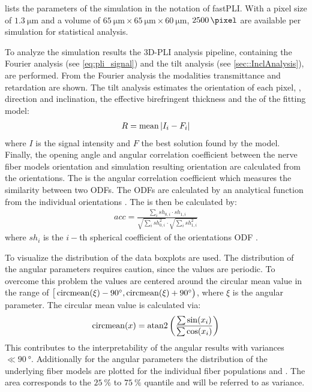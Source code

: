 %
 lists the parameters of the simulation in the notation of \ac{fastPLI}.
With a pixel size of $\SI{1.3}{\micro\meter}$ and a volume of $\SI{65}{\micro\meter} \times \SI{65}{\micro\meter} \times \SI{60}{\micro\meter}$, $\SI{2500}{\pixel}$ are available per simulation for statistical analysis.
\par
%
To analyze the simulation results the \ac{3D-PLI} analysis pipeline, containing the Fourier analysis (see \cref{eq:pli_signal}) and the tilt analysis (see \cref{sec::InclAnalysis}), are performed.
From the Fourier analysis the modalities transmittance and retardation are shown.
The tilt analysis estimates the orientation of each pixel, \ie{}, direction and inclination, the effective birefringent thickness \trel{} and the \rvalue{} of the fitting model:
\begin{align}
    R = \operatorname{mean}{|I_i-F_i|} \label{eq:rvalue}
\end{align}
where $I$ is the signal intensity and $F$ the best solution found by the model.
Finally, the opening angle \openingAngle{} and angular correlation coefficient \accvalue{} between the nerve fiber models orientation and simulation resulting orientation are calculated from the orientations.
The \accvalue{} is the angular correlation coefficient which measures the similarity between two \acp{ODF}. The \acp{ODF} are calculated by an analytical function from the individual orientations \cite{Alimi2020}.
The \accvalue{} is then be calculated by:
\begin{align}
    acc = \frac{\sum_i{\mathit{sh}_{0,i} \cdot \mathit{sh}_{1,i}}}{\sqrt{\sum_i{\mathit{sh}_{0,i}^2}} \cdot \sqrt{\sum_i{\mathit{sh}_{1,i}^2}}}
\end{align}
where $\mathit{sh}_i$ is the $i-$th spherical coefficient of the orientations \ac{ODF} \cite{Schilling2018}.
\par
%
To visualize the distribution of the data boxplots are used.
The distribution of the angular parameters requires caution, since the values are periodic.
To overcome this problem the values are centered around the circular mean value in the range of $\big[\operatorname{circmean} (\xi)-\SI{90}{\degree}, \operatorname{circmean}(\xi)+\SI{90}{\degree}\big)$, where $\xi$ is the angular parameter.
The circular mean value is calculated via:
\begin{align}
    \operatorname{circmean}(x) = \operatorname{atan2} \left ( \frac{\sum \sin(x_i) }{\sum \cos(x_i) } \right )
\end{align}
This contributes to the interpretability of the angular results with variances $\ll \SI{90}{\degree}$.
Additionally for the angular parameters the distribution of the underlying fiber models are plotted for the individual fiber populations \popa{} and \popb{}.
The area corresponds to the $\SI{25}{\percent}$ to $\SI{75}{\percent}$ quantile and will be referred to as \bvariance{} variance.
%
%
%
